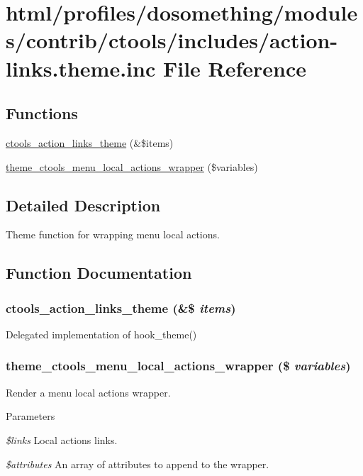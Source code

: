 \hypertarget{action-links_8theme_8inc}{
\section{html/profiles/dosomething/modules/contrib/ctools/includes/action-\/links.theme.inc File Reference}
\label{action-links_8theme_8inc}
}
\subsection*{Functions}
\begin{DoxyCompactItemize}
\item 
\hyperlink{action-links_8theme_8inc_a2e3db09f0736b3a266982b5d90e575e1}{ctools\_\-action\_\-links\_\-theme} (\&\$items)
\item 
\hyperlink{action-links_8theme_8inc_afe90632f344fea0f367310221e0338d1}{theme\_\-ctools\_\-menu\_\-local\_\-actions\_\-wrapper} (\$variables)
\end{DoxyCompactItemize}


\subsection{Detailed Description}
Theme function for wrapping menu local actions. 

\subsection{Function Documentation}
\hypertarget{action-links_8theme_8inc_a2e3db09f0736b3a266982b5d90e575e1}{
\subsubsection[{ctools\_\-action\_\-links\_\-theme}]{\setlength{\rightskip}{0pt plus 5cm}ctools\_\-action\_\-links\_\-theme (\&\$ {\em items})}}
\label{action-links_8theme_8inc_a2e3db09f0736b3a266982b5d90e575e1}
Delegated implementation of hook\_\-theme() \hypertarget{action-links_8theme_8inc_afe90632f344fea0f367310221e0338d1}{
\subsubsection[{theme\_\-ctools\_\-menu\_\-local\_\-actions\_\-wrapper}]{\setlength{\rightskip}{0pt plus 5cm}theme\_\-ctools\_\-menu\_\-local\_\-actions\_\-wrapper (\$ {\em variables})}}
\label{action-links_8theme_8inc_afe90632f344fea0f367310221e0338d1}
Render a menu local actions wrapper.


\begin{DoxyParams}{Parameters}
\item[{\em \$links}]Local actions links. \item[{\em \$attributes}]An array of attributes to append to the wrapper. \end{DoxyParams}
